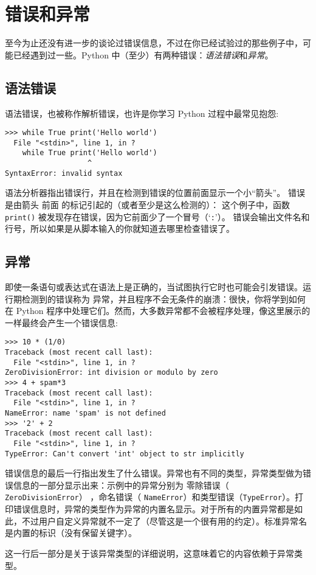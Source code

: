 \chapter{错误和异常\label{ErrorException}}
至今为止还没有进一步的谈论过错误信息，不过在你已经试验过的那些例子中，可能已经遇到过一些。Python 中（至少）有两种错误：\textit{语法错误}和\textit{异常}。
\section{语法错误}
语法错误，也被称作解析错误，也许是你学习 Python 过程中最常见抱怨:
\begin{lstlisting}
>>> while True print('Hello world')
  File "<stdin>", line 1, in ?
    while True print('Hello world')
                   ^
SyntaxError: invalid syntax
\end{lstlisting}
语法分析器指出错误行，并且在检测到错误的位置前面显示一个小“箭头”。 错误是由箭头 前面 的标记引起的（或者至少是这么检测的）： 这个例子中，函数 \texttt{print()} 被发现存在错误，因为它前面少了一个冒号（‘\verb|:|’）。 错误会输出文件名和行号，所以如果是从脚本输入的你就知道去哪里检查错误了。
\section{异常}
即使一条语句或表达式在语法上是正确的，当试图执行它时也可能会引发错误。运行期检测到的错误称为 异常，并且程序不会无条件的崩溃：很快，你将学到如何在 Python 程序中处理它们。然而，大多数异常都不会被程序处理，像这里展示的一样最终会产生一个错误信息:
\begin{lstlisting}
>>> 10 * (1/0)
Traceback (most recent call last):
  File "<stdin>", line 1, in ?
ZeroDivisionError: int division or modulo by zero
>>> 4 + spam*3
Traceback (most recent call last):
  File "<stdin>", line 1, in ?
NameError: name 'spam' is not defined
>>> '2' + 2
Traceback (most recent call last):
  File "<stdin>", line 1, in ?
TypeError: Can't convert 'int' object to str implicitly
\end{lstlisting}
错误信息的最后一行指出发生了什么错误。异常也有不同的类型，异常类型做为错误信息的一部分显示出来：示例中的异常分别为 零除错误（ \texttt{ZeroDivisionError}） ，命名错误（ \texttt{NameError}）和类型错误（\texttt{TypeError}）。打印错误信息时，异常的类型作为异常的内置名显示。对于所有的内置异常都是如此，不过用户自定义异常就不一定了（尽管这是一个很有用的约定）。标准异常名是内置的标识（没有保留关键字）。

这一行后一部分是关于该异常类型的详细说明，这意味着它的内容依赖于异常类型。

